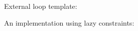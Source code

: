 \subsection*{}


\begin{bclogo}[logo=\bcinfo]{\small External loop template:}
\vspace{.2cm} \tiny




\vspace{.2cm}
\end{bclogo}


\newpage
\begin{bclogo}[logo=\bcinfo]{\small An implementation using lazy constraints:}
\vspace{.2cm} \tiny




\vspace{.2cm}
\end{bclogo}

\newpage

     

